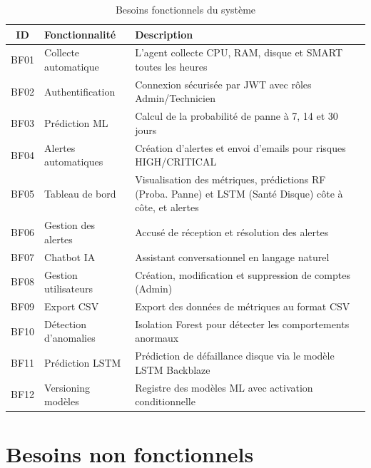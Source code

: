 \begin{table}[H]
\centering
\caption{Besoins fonctionnels du système}
\begin{tabularx}{\textwidth}{|c|l|X|}
\hline
\rowcolor{lightblue}
\textbf{ID} & \textbf{Fonctionnalité} & \textbf{Description} \\
\hline
BF01 & Collecte automatique & L'agent collecte CPU, RAM, disque et SMART toutes les heures \\
\hline
BF02 & Authentification & Connexion sécurisée par JWT avec rôles Admin/Technicien \\
\hline
BF03 & Prédiction ML & Calcul de la probabilité de panne à 7, 14 et 30 jours \\
\hline
BF04 & Alertes automatiques & Création d'alertes et envoi d'emails pour risques HIGH/CRITICAL \\
\hline
BF05 & Tableau de bord & Visualisation des métriques, prédictions RF (Proba. Panne) et LSTM (Santé Disque) côte à côte, et alertes \\
\hline
BF06 & Gestion des alertes & Accusé de réception et résolution des alertes \\
\hline
BF07 & Chatbot IA & Assistant conversationnel en langage naturel \\
\hline
BF08 & Gestion utilisateurs & Création, modification et suppression de comptes (Admin) \\
\hline
BF09 & Export CSV & Export des données de métriques au format CSV \\
\hline
BF10 & Détection d'anomalies & Isolation Forest pour détecter les comportements anormaux \\
\hline
BF11 & Prédiction LSTM & Prédiction de défaillance disque via le modèle LSTM Backblaze \\
\hline
BF12 & Versioning modèles & Registre des modèles ML avec activation conditionnelle \\
\hline
\end{tabularx}
\end{table}

\section{Besoins non fonctionnels}

